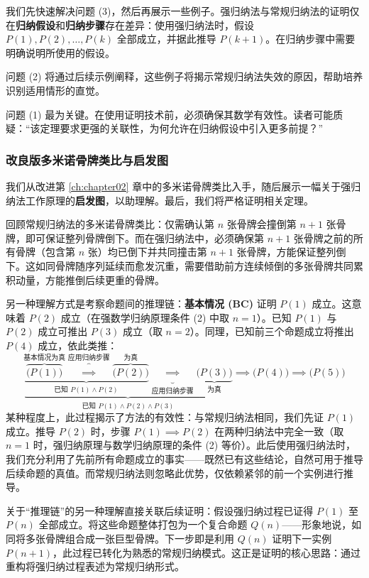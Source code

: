 我们先快速解决问题 (3)，然后再展示一些例子。强归纳法与常规归纳法的证明仅在\textbf{归纳假设}和\textbf{归纳步骤}存在差异：使用强归纳法时，假设 $P(1), P(2), \ldots, P(k)$ 全部成立，并据此推导 $P(k+1)$。在归纳步骤中需要明确说明所使用的假设。

问题 (2) 将通过后续示例阐释，这些例子将揭示常规归纳法失效的原因，帮助培养识别适用情形的直觉。

问题 (1) 最为关键。在使用证明技术前，必须确保其数学有效性。读者可能质疑：``该定理要求更强的关联性，为何允许在归纳假设中引入更多前提？''

\subsubsection*{改良版多米诺骨牌类比与启发图}

我们从改进第 \ref{ch:chapter02} 章中的多米诺骨牌类比入手，随后展示一幅关于强归纳法工作原理的\textbf{启发图}，以助理解。最后，我们将严格证明相关定理。

回顾常规归纳法的多米诺骨牌类比：仅需确认第 $n$ 张骨牌会撞倒第 $n+1$ 张骨牌，即可保证整列骨牌倒下。而在强归纳法中，必须确保第 $n+1$ 张骨牌之前的所有骨牌（包含第 $n$ 张）均已倒下并共同撞击第 $n+1$ 张骨牌，方能保证整列倒下。这如同骨牌随序列延续而愈发沉重，需要借助前方连续倾倒的多张骨牌共同累积动量，方能推倒后续更重的骨牌。

另一种理解方式是考察命题间的推理链：\textbf{基本情况 (BC)} 证明 $P(1)$ 成立。这意味着 $P(2)$ 成立（在强数学归纳原理条件 (2) 中取 $n = 1$）。已知 $P(1)$ 与 $P(2)$ 成立可推出 $P(3)$ 成立（取 $n=2$）。同理，已知前三个命题成立将推出 $P(4)$ 成立，依此类推：
\[\underbrace{\underbrace{\overbrace{\Big(P(1)\Big)}^{\text{基本情况为真}} \overbrace{\implies}^{\text{应用归纳步骤}} \overbrace{\Big(P(2)\Big)}^{\text{为真}}}_{\text{已知 } P(1) \land P(2)} \underbrace{\implies}_{\text{应用归纳步骤}} \underbrace{\Big(P(3)\Big)}_{\text{为真}}}_{\text{已知 } P(1) \land P(2) \land P(3)} \implies\Big(P(4)\Big) \implies \Big(P(5)\Big)\]
某种程度上，此过程揭示了方法的有效性：与常规归纳法相同，我们先证 $P(1)$ 成立。推导 $P(2)$ 时，步骤 $P(1) \implies P(2)$ 在两种归纳法中完全一致（取 $n=1$ 时，强归纳原理与数学归纳原理的条件 (2) 等价）。此后使用强归纳法时，我们充分利用了先前所有命题成立的事实——既然已有这些结论，自然可用于推导后续命题的真值。而常规归纳法则忽略此优势，仅依赖紧邻的前一个实例进行推导。

关于``推理链''的另一种理解直接关联后续证明：假设强归纳过程已证得 $P(1)$ 至 $P(n)$ 全部成立。将这些命题整体打包为一个复合命题 $Q(n)$——形象地说，如同将多张骨牌组合成一张巨型骨牌。下一步即是利用 $Q(n)$ 证明下一实例 $P(n+1)$，此过程已转化为熟悉的常规归纳模式。这正是证明的核心思路：通过重构将强归纳过程表述为常规归纳形式。

